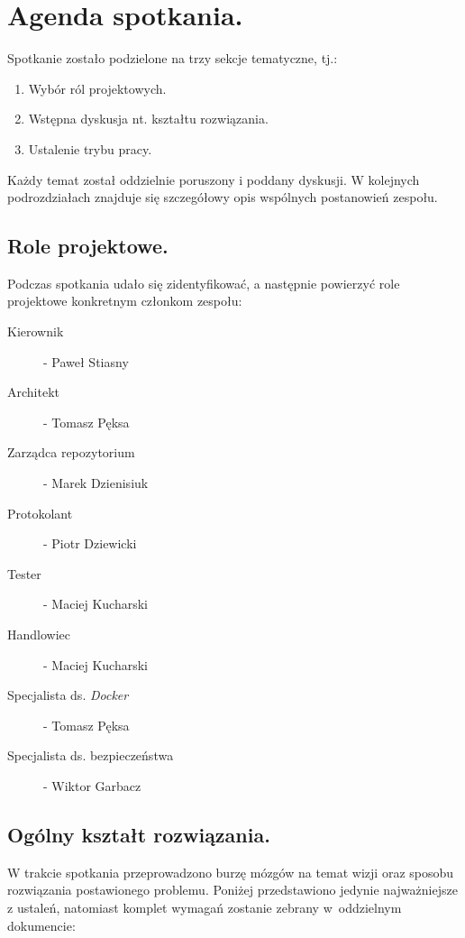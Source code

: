 \documentclass[a4paper,11pt]{article}
\begin{document}
\section{Agenda spotkania.}
  Spotkanie zostało podzielone na trzy sekcje tematyczne, tj.:
  
  \begin{enumerate}
    \item Wybór ról projektowych.
    \item Wstępna dyskusja nt. kształtu rozwiązania.
    \item Ustalenie trybu pracy.
  \end{enumerate}
  
  Każdy temat został oddzielnie poruszony i poddany dyskusji.
  W kolejnych podrozdziałach znajduje się szczegółowy opis wspólnych postanowień zespołu.

\subsection{Role projektowe.}
  Podczas spotkania udało się zidentyfikować, a następnie powierzyć role projektowe konkretnym członkom zespołu:
  
  \begin{description}
    \item[Kierownik] - Paweł Stiasny
    \item[Architekt] - Tomasz Pęksa
    \item[Zarządca repozytorium] - Marek Dzienisiuk
    \item[Protokolant] - Piotr Dziewicki
    \item[Tester] - Maciej Kucharski
    \item[Handlowiec] - Maciej Kucharski
    \item[Specjalista ds. \textit{Docker}] - Tomasz Pęksa
    \item[Specjalista ds. bezpieczeństwa] - Wiktor Garbacz
  \end{description}
  
\subsection{Ogólny kształt rozwiązania.}
  W trakcie spotkania przeprowadzono burzę mózgów na temat wizji oraz sposobu rozwiązania postawionego problemu.
  Poniżej przedstawiono jedynie najważniejsze z ustaleń, natomiast komplet wymagań zostanie zebrany w~oddzielnym dokumencie:
  
\end{document}
